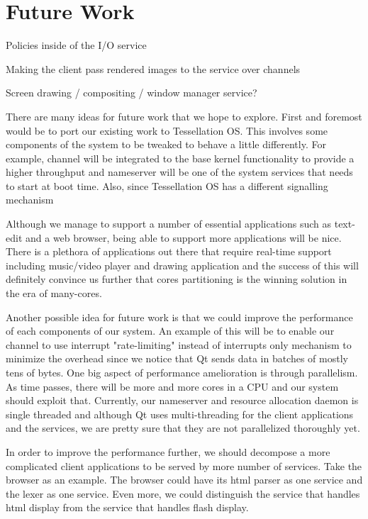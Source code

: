 \documentclass[letterpaper,twocolumn,11pt]{article}
\begin{document}
\section{Future Work}

Policies inside of the I/O service

Making the client pass rendered images to the service over channels

Screen drawing / compositing / window manager service?

There are many ideas for future work that we hope to explore. First and foremost would be to port our existing work to Tessellation OS. This involves some components of the system to be tweaked to behave a little differently. For example, channel will be integrated to the base kernel functionality to provide a higher throughput and nameserver will be one of the system services that needs to start at boot time. Also, since Tessellation OS has a different signalling mechanism 

Although we manage to support a number of essential applications such as text-edit and a web browser, being able to support more applications will be nice. There is a plethora of applications out there that require real-time support including music/video player and drawing application and the success of this will definitely convince us further that cores partitioning is the winning solution in the era of many-cores.

Another possible idea for future work is that we could improve the performance of each components of our system. An example of this will be to enable our channel to use interrupt "rate-limiting" instead of interrupts only mechanism to minimize the overhead since we notice that Qt sends data in batches of mostly tens of bytes. One big aspect of performance amelioration is through parallelism. As time passes, there will be more and more cores in a CPU and our system should exploit that. Currently, our nameserver and resource allocation daemon is single threaded and although Qt uses multi-threading for the client applications and the services, we are pretty sure that they are not parallelized thoroughly yet. 

In order to improve the performance further, we should decompose a more complicated client applications to be served by more number of services. Take the browser as an example. The browser could have its html parser as one service and the lexer as one service. Even more, we could distinguish the service that handles html display from the service that handles flash display.
\end{document}
